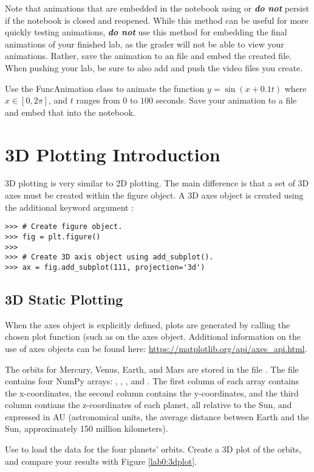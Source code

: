 \begin{warn}
Note that animations that are embedded in the notebook using  or  \textbf{\emph{do not}} persist if the notebook is closed and reopened.
While this method can be useful for more quickly testing animations, \textbf{\emph{do not}} use this method for embedding the final animations of your finished lab, as the grader will not be able to view your animations.
Rather, save the animation to an  file and embed the created file.
When pushing your lab, be sure to also add and push the video files you create.
\end{warn}

\begin{problem}
Use the FuncAnimation class to animate the function $y=\sin(x+0.1t)$ where $x \in [0,2\pi]$, and $t$ ranges from $0$ to $100$ seconds. 
Save your animation to a file and embed that into the notebook.
\end{problem}

\section*{3D Plotting Introduction}
3D plotting is very similar to 2D plotting.
The main difference is that a set of 3D axes must be created within the figure object.
A 3D axes object is created using the additional keyword argument :

\begin{lstlisting}
>>> # Create figure object.
>>> fig = plt.figure()
>>>
>>> # Create 3D axis object using add_subplot().
>>> ax = fig.add_subplot(111, projection='3d')
\end{lstlisting}

\subsection*{3D Static Plotting}

When the axes object is explicitly defined, plots are generated by calling the chosen plot function (such as  on the axes object.
Additional information on the use of axes objects can be found here: \href{https://matplotlib.org/api/axes\_api.html}{https://matplotlib.org/api/axes\_api.html}.

\begin{problem}
The orbits for Mercury, Venus, Earth, and Mars are stored in the file .
The file contains four NumPy arrays: , , , and .
The first column of each array contains the x-coordinates, the second column contains the y-coordinates, and the third column contians the z-coordinates of each planet, all relative to the Sun, and expressed in AU (astronomical units, the average distance between Earth and the Sun, approximately 150 million kilometers).

Use  to load the data for the four planets' orbits.
Create a 3D plot of the orbits, and compare your results with Figure \ref{lab0:3dplot}.
\end{problem}


